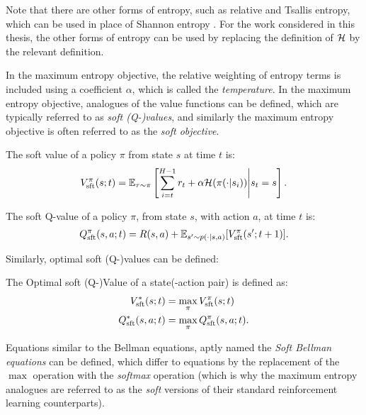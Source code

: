         Note that there are other forms of entropy, such as relative and Tsallis entropy, which can be used in place of Shannon entropy . For the work considered in this thesis, the other forms of entropy can be used by replacing the definition of $\mathcal{H}$ by the relevant definition.

        In the maximum entropy objective, the relative weighting of entropy terms is included using a coefficient $\alpha$, which is called the \textit{temperature}. In the maximum entropy objective, analogues of the value functions can be defined, which are typically referred to as \textit{soft (Q-)values}, and similarly the maximum entropy objective is often referred to as the \textit{soft objective}.

        \begin{defn}
            \label{def:sft_value}
            \label{def:sft_q_value}
            The \textnormal{soft value} of a policy $\pi$ from state $s$ at time $t$ is:
            \begin{align}
                V_{\textnormal{sft}}^{\pi}(s;t) = \mathbb{E}_{\tau\sim\pi}\left[\sum_{i=t}^{H-1} r_t + \alpha\mathcal{H}(\pi(\cdot|s_i)) \Bigg| s_t=s \right].
            \end{align} 

            The \textnormal{soft Q-value} of a policy $\pi$, from state $s$, with action $a$, at time $t$ is:
            \begin{align}
                Q_{\textnormal{sft}}^{\pi}(s,a;t) = R(s,a) + \mathbb{E}_{s'\sim p(\cdot|s,a)} [V_{\textnormal{sft}}^{\pi}(s';t+1)].
            \end{align} 
        \end{defn}

        Similarly, optimal soft (Q-)values can be defined:
        \begin{defn}
            \label{def:optimal_sft_value}
            \label{def:optimal_sft_q_value}
            The \textnormal{Optimal soft (Q-)Value} of a state(-action pair) is defined as:
            \begin{align}
                V_{\textnormal{sft}}^*(s;t) &= \max_{\pi} V_{\textnormal{sft}}^{\pi}(s;t) \\
                Q_{\textnormal{sft}}^*(s,a;t) &= \max_{\pi} Q_{\textnormal{sft}}^{\pi}(s,a;t).
            \end{align}
        \end{defn}

        Equations similar to the Bellman equations, aptly named the \textit{Soft Bellman equations} can be defined, which differ to equations  by the replacement of the $\max$ operation with the \textit{softmax} operation (which is why the maximum entropy analogues are referred to as the \textit{soft} versions of their standard reinforcement learning counterparts).


